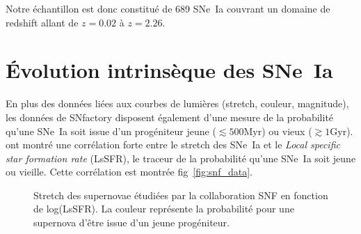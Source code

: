 \documentclass[a4paper, 12pt, svgnames]{article}
\begin{document}
Notre échantillon est donc constitué de 689 SNe~Ia couvrant un domaine de
redshift allant de $z=0.02$ à $z=2.26$.

\section{Évolution intrinsèque des SNe~Ia}\label{sec:stretchevol}

En plus des données liées aux courbes de lumières (stretch, couleur, magnitude),
les données de SNfactory disposent également d'une mesure de la probabilité
qu'une SNe~Ia soit issue d'un progéniteur jeune ($\lesssim 500 \mathrm{Myr}$) ou
vieux ($\gtrsim 1 \mathrm{Gyr}$). \cite{rigault_strong_2018} ont montré une
corrélation forte entre le stretch des SNe~Ia et le \textit{Local specific star
formation rate} (LsSFR), le traceur de la probabilité qu'une SNe~Ia soit jeune
ou vieille. Cette corrélation est montrée fig~\ref{fig:snf_data}.

\begin{figure}[htbp!]
    \centering
    \captionsetup{justification=centering}
    \caption{Stretch des supernovae étudiées par la collaboration SNF en
    fonction de log(LsSFR). La couleur représente la probabilité pour une
supernova d'être issue d'un jeune progéniteur.}
\end{figure}
\end{document}
